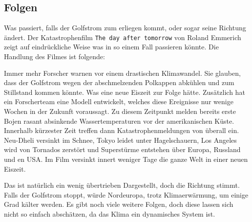 \subsection{Folgen}

Was passiert, falls der Golfstrom zum erliegen kommt, oder sogar seine Richtung ändert.
Der Katastrophenfilm \texttt{The day after tomorrow} von Roland Emmerich zeigt auf eindrückliche Weise was in so einem Fall passieren könnte. Die Handlung des Filmes ist folgende:

Immer mehr Forscher warnen vor einem drastischen Klimawandel. Sie glauben, dass der Golfstrom wegen der abschmelzenden Polkappen abkühlen und zum Stillstand kommen könnte. Was eine neue Eiszeit zur Folge hätte.
Zusätzlich hat ein Forscherteam eine Modell entwickelt, welches diese Ereignisse nur wenige Wochen in der Zukunft voraussagt. Zu diesem Zeitpunkt melden bereits erste Bojen rasant absinkende Wassertemperaturen vor der amerikanischen Küste. Innerhalb kürzester Zeit treffen dann Katastrophenmeldungen von überall ein. Neu-Dheli versinkt im Schnee, Tokyo leidet unter Hagelschauern, Los Angeles wird von Tornados zerstört und Superstürme entstehen über Europa, Russland und en USA. 
Im Film versinkt innert weniger Tage die ganze Welt in einer neuen Eiszeit. 

Das ist natürlich ein wenig übertrieben Dargestellt, doch die Richtung stimmt. Falls der Golfstrom stoppt, würde Nordeuropa, trotz Klimaerwärmung, um einige Grad kälter werden. Es gibt noch viele weitere Folgen, doch diese lassen sich nicht so einfach abschätzen, da das Klima ein dynamisches System ist.

